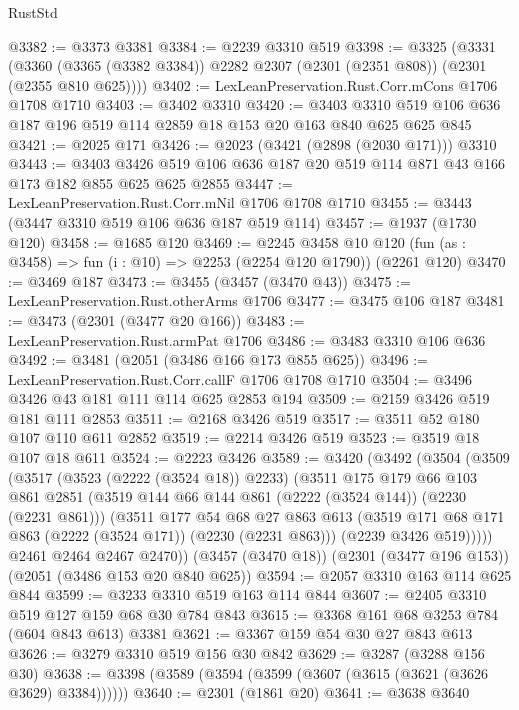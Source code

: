 \begin{lexlean}{RustStd}
\begin{coremodule}
@3382 := @3373 @3381
@3384 := @2239 @3310 @519
@3398 := @3325
    (@3331 (@3360 (@3365 (@3382 @3384)) @2282 @2307 (@2301 (@2351 @808)) (@2301 (@2355 @810 @625))))
@3402 := LexLeanPreservation.Rust.Corr.mCons @1706 @1708 @1710
@3403 := @3402 @3310
@3420 := @3403 @3310 @519 @106 @636 @187 @196 @519 @114 @2859 @18 @153 @20 @163 @840 @625 @625 @845
@3421 := @2025 @171
@3426 := @2023 (@3421 (@2898 (@2030 @171))) @3310
@3443 := @3403 @3426 @519 @106 @636 @187 @20 @519 @114 @871 @43 @166 @173 @182 @855 @625 @625 @2855
@3447 := LexLeanPreservation.Rust.Corr.mNil @1706 @1708 @1710
@3455 := @3443 (@3447 @3310 @519 @106 @636 @187 @519 @114)
@3457 := @1937 (@1730 @120)
@3458 := @1685 @120
@3469 := @2245
    @3458
    @10
    @120
    (fun (as : @3458) => fun (i : @10) => @2253 (@2254 @120 @1790))
    (@2261 @120)
@3470 := @3469 @187
@3473 := @3455 (@3457 (@3470 @43))
@3475 := LexLeanPreservation.Rust.otherArms @1706
@3477 := @3475 @106 @187
@3481 := @3473 (@2301 (@3477 @20 @166))
@3483 := LexLeanPreservation.Rust.armPat @1706
@3486 := @3483 @3310 @106 @636
@3492 := @3481 (@2051 (@3486 @166 @173 @855 @625))
@3496 := LexLeanPreservation.Rust.Corr.callF @1706 @1708 @1710
@3504 := @3496 @3426 @43 @181 @111 @114 @625 @2853 @194
@3509 := @2159 @3426 @519 @181 @111 @2853
@3511 := @2168 @3426 @519
@3517 := @3511 @52 @180 @107 @110 @611 @2852
@3519 := @2214 @3426 @519
@3523 := @3519 @18 @107 @18 @611
@3524 := @2223 @3426
@3589 := @3420
    (@3492
      (@3504
        (@3509
          (@3517
            (@3523 (@2222 (@3524 @18)) @2233)
            (@3511
              @175
              @179
              @66
              @103
              @861
              @2851
              (@3519 @144 @66 @144 @861 (@2222 (@3524 @144)) (@2230 (@2231 @861)))
              (@3511
                @177
                @54
                @68
                @27
                @863
                @613
                (@3519 @171 @68 @171 @863 (@2222 (@3524 @171)) (@2230 (@2231 @863)))
                (@2239 @3426 @519)))))
        @2461
        @2464
        @2467
        @2470))
    (@3457 (@3470 @18))
    (@2301 (@3477 @196 @153))
    (@2051 (@3486 @153 @20 @840 @625))
@3594 := @2057 @3310 @163 @114 @625 @844
@3599 := @3233 @3310 @519 @163 @114 @844
@3607 := @2405 @3310 @519 @127 @159 @68 @30 @784 @843
@3615 := @3368 @161 @68 @3253 @784 (@604 @843 @613) @3381
@3621 := @3367 @159 @54 @30 @27 @843 @613
@3626 := @3279 @3310 @519 @156 @30 @842
@3629 := @3287 (@3288 @156 @30)
@3638 := @3398 (@3589 (@3594 (@3599 (@3607 (@3615 (@3621 (@3626 @3629) @3384))))))
@3640 := @2301 (@1861 @20)
@3641 := @3638 @3640

\end{coremodule}
\end{lexlean}
